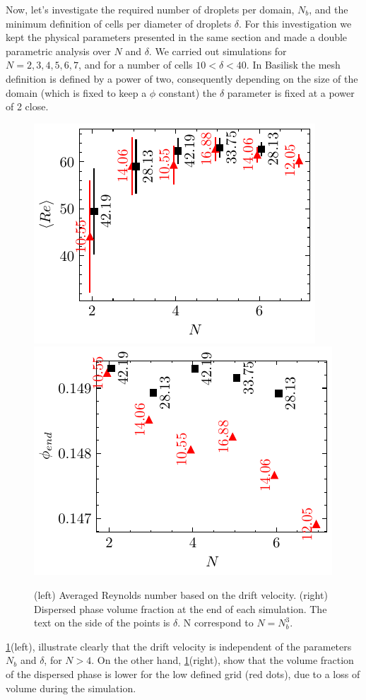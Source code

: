 Now, let's investigate the required number of droplets per domain, $N_b$, and the minimum definition of cells per diameter of droplets $\delta$.  
For this investigation we kept the physical parameters presented in the same section and made a double parametric analysis over $N$ and $\delta$. 
We carried out simulations for $N = 2, 3, 4, 5, 6, 7$, and for a number of cells $10 <\delta < 40$. 
In Basilisk the mesh definition is defined by a power of two, consequently depending on the size of the domain (which is fixed to keep a $\phi$ constant) the $\delta$ parameter is fixed at a power of 2 close. 
\begin{figure}[h!]
    \centering
    \includegraphics[height= 0.3\textwidth]{image/VALIDATION/N_and_delta/DUd.pdf}
    \includegraphics[height= 0.3\textwidth]{image/VALIDATION/N_and_delta/PHI.pdf}
    \caption{(left) Averaged Reynolds number based on the drift velocity.
            (right) Dispersed phase volume fraction at the end of each simulation.
            The text on the side of the points is $\delta$.
            N correspond to $N = N_b^3$. }
    \label{fig:VALIDATION_Nd_1}
\end{figure}
\ref{fig:VALIDATION_Nd_1}(left), illustrate clearly that the drift velocity is independent of the parameters $N_b$ and $\delta$, for $N >4$. 
On the other hand, \ref{fig:VALIDATION_Nd_1}(right), show that the volume fraction of the dispersed phase is lower for the low defined grid (red dots), due to a loss of volume during the simulation.
